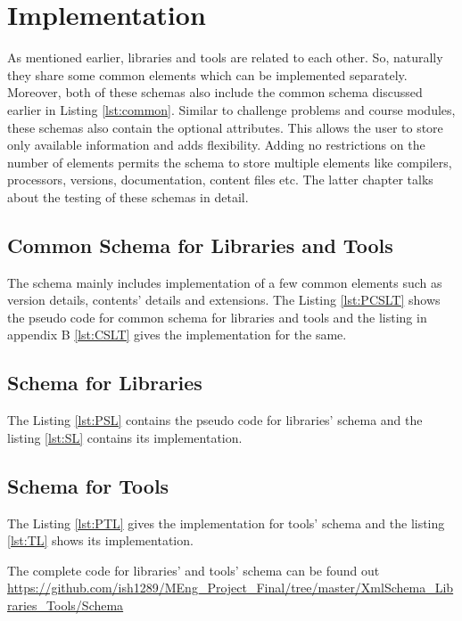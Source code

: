 \documentclass[11pt,letterpaper]{report}
\begin{document}
\section{Implementation}
As mentioned earlier, libraries and tools are related to each other. So, naturally they share some common elements which can be implemented separately. Moreover, both of these schemas also include the common schema discussed earlier in Listing \ref{lst:common}. Similar to challenge problems and course modules, these schemas also contain the optional attributes. This allows the user to store only available information and adds flexibility. Adding no restrictions on the number of elements permits the schema to store multiple elements like compilers, processors, versions, documentation, content files etc. The latter chapter talks about the testing of these schemas in detail. 
\subsection{Common Schema for Libraries and Tools}
The schema mainly includes implementation of a few common elements such as version details, contents' details and extensions. The Listing \ref{lst:PCSLT} shows the pseudo code for common schema for libraries and tools and the listing in appendix B \ref{lst:CSLT} gives the implementation for the same.
  
\subsection{Schema for Libraries}
The Listing \ref{lst:PSL} contains the pseudo code for libraries' schema and the listing \ref{lst:SL}
contains its implementation. 

\subsection{Schema for Tools}
The Listing \ref{lst:PTL} gives the implementation for tools' schema and the listing \ref{lst:TL}
shows its implementation.  


\bigskip
The complete code for libraries' and tools' schema can be found out \url{https://github.com/ish1289/MEng_Project_Final/tree/master/XmlSchema_Libraries_Tools/Schema}
\end{document}
